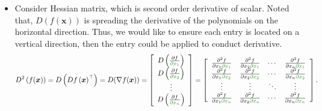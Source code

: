 \documentclass[12pt,thmsa]{article}
\begin{document}
\begin{itemize}
	\item Consider Hessian matrix, which is second order derivative of scalar. Noted that, \( D \left( f(\boldsymbol{x}) \right)\) is spreading the derivative of the polynomials on the horizontal direction. Thus, we would like to ensure each entry is located on a vertical direction, then the entry could be applied to conduct derivative.
	\[ D^{2} \left( f(\boldsymbol{x}) \right)
	= D \left(  D f \left( \boldsymbol{x} \right)^{\top} \right)
	= D(\nabla f(\boldsymbol{x}))
	= \left[\begin{array}{c}    
		D\left(\frac{\partial f}{ \color{forestgreen}{\partial x_{1}} }\right) \\    
		D\left(\frac{\partial f}{ \color{forestgreen}{\partial x_{2}} }\right) \\    
		\vdots \\    
		D\left(\frac{\partial f}{ \color{forestgreen}{\partial x_{n}} }\right)    
	\end{array}
	\right]
	=\left[\begin{array}{cccc}    
		\frac{\partial^{2} f}{\partial x_{1} \color{forestgreen}{\partial x_{1}}} 
		& \frac{\partial^{2} f}{\partial x_{2} \color{forestgreen}{\partial x_{1}}} 
		& \cdots 
		& \frac{\partial^{2} f}{\partial x_{n} \color{forestgreen}{\partial x_{1}}} \\    
		\frac{\partial^{2} f}{\partial x_{1} \color{forestgreen}{\partial x_{2}}} 
		& \frac{\partial^{2} f}{\partial x_{2} \color{forestgreen}{\partial x_{2}}} 
		& \cdots 
		& \frac{\partial^{2} f}{\partial x_{n} \color{forestgreen}{\partial x_{2}}} \\    
		\vdots & \vdots & \ddots & \vdots \\    
		\frac{\partial^{2} f}{\partial x_{1} \color{forestgreen}{\partial x_{n}}} 
		& \frac{\partial^{2} f}{\partial x_{2} \color{forestgreen}{\partial x_{n}}} 
		& \cdots 
		& \frac{\partial^{2} f}{\partial x_{n} \color{forestgreen}{\partial x_{n}}}
	\end{array}
	\right] .
	\]


\end{itemize}
\end{document}
